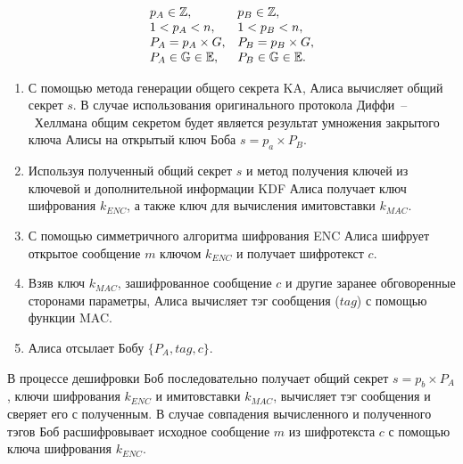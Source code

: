 \[ \begin{array}{ll}
	p_A \in \mathbb{Z}, & p_B \in \mathbb{Z}, \\
	1 < p_A < n, & 1 < p_B < n, \\
	P_A = p_A \times G, & P_B = p_B \times G, \\
	P_A \in \mathbb{G} \in \mathbb{E}, & P_B \in \mathbb{G} \in \mathbb{E}.\\
\end{array} \]

\begin{enumerate}
	\item С помощью метода генерации общего секрета KA, Алиса вычисляет общий секрет $s$. В случае использования оригинального протокола Диффи~--~Хеллмана общим секретом будет является результат умножения закрытого ключа Алисы на открытый ключ Боба $s = p_a \times P_B$.
	\item Используя полученный общий секрет $s$ и метод получения ключей из ключевой и дополнительной информации KDF Алиса получает ключ шифрования $k_{ENC}$, а также ключ для вычисления имитовставки $k_{MAC}$.
	\item С помощью симметричного алгоритма шифрования ENC Алиса шифрует открытое сообщение $m$ ключом $k_{ENC}$ и получает шифротекст $c$.
	\item Взяв ключ $k_{MAC}$, зашифрованное сообщение $c$ и другие заранее обговоренные сторонами параметры, Алиса вычисляет тэг сообщения ($tag$) с помощью функции MAC.
	\item Алиса отсылает Бобу $\{P_A, tag, c\}$.
\end{enumerate}

В процессе дешифровки Боб последовательно получает общий секрет $s = p_b \times P_A$, ключи шифрования $k_{ENC}$ и имитовставки $k_{MAC}$, вычисляет тэг сообщения и сверяет его с полученным. В случае совпадения вычисленного и полученного тэгов Боб расшифровывает исходное сообщение $m$ из шифротекста $c$ с помощью ключа шифрования $k_{ENC}$.

